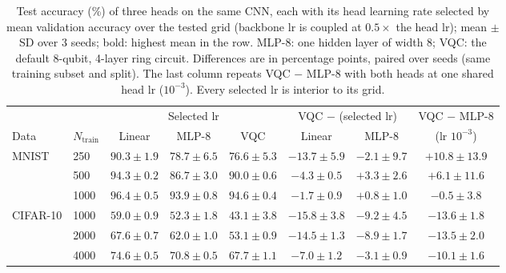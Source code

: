 \begin{table}[t]
\centering
\caption{Test accuracy (\%) of three heads on the same CNN, each with its head learning rate
selected by mean validation accuracy over the tested grid (backbone lr is coupled at $0.5\times$
the head lr); mean $\pm$ SD over 3 seeds; bold: highest mean in the row. MLP-8: one hidden
layer of width 8; VQC: the default 8-qubit, 4-layer ring circuit. Differences are in
percentage points, paired over seeds (same training subset and split). The last column
repeats VQC $-$ MLP-8 with both heads at one shared head lr ($10^{-3}$). Every selected lr is
interior to its grid.}
\label{tab:matched}
\small
\setlength{\tabcolsep}{4pt}
\begin{tabular}{llcccccc}
\toprule
& & \multicolumn{3}{c}{Selected lr} & \multicolumn{2}{c}{VQC $-$ (selected lr)} & VQC $-$ MLP-8 \\
\cmidrule(lr){3-5}\cmidrule(lr){6-7}\cmidrule(lr){8-8}
Data & $N_\mathrm{train}$ & Linear & MLP-8 & VQC & Linear & MLP-8 & (lr $10^{-3}$) \\
\midrule
\multirow{3}{*}{MNIST} & 250 & $\mathbf{90.3 \pm 1.9}$ & $78.7 \pm 6.5$ & $76.6 \pm 5.3$ & $-13.7 \pm 5.9$ & $-2.1 \pm 9.7$ & $+10.8 \pm 13.9$ \\
 & 500 & $\mathbf{94.3 \pm 0.2}$ & $86.7 \pm 3.0$ & $90.0 \pm 0.6$ & $-4.3 \pm 0.5$ & $+3.3 \pm 2.6$ & $+6.1 \pm 11.6$ \\
 & 1000 & $\mathbf{96.4 \pm 0.5}$ & $93.9 \pm 0.8$ & $94.6 \pm 0.4$ & $-1.7 \pm 0.9$ & $+0.8 \pm 1.0$ & $-0.5 \pm 3.8$ \\
\midrule
\multirow{3}{*}{CIFAR-10} & 1000 & $\mathbf{59.0 \pm 0.9}$ & $52.3 \pm 1.8$ & $43.1 \pm 3.8$ & $-15.8 \pm 3.8$ & $-9.2 \pm 4.5$ & $-13.6 \pm 1.8$ \\
 & 2000 & $\mathbf{67.6 \pm 0.7}$ & $62.0 \pm 1.0$ & $53.1 \pm 0.9$ & $-14.5 \pm 1.3$ & $-8.9 \pm 1.7$ & $-13.5 \pm 2.0$ \\
 & 4000 & $\mathbf{74.6 \pm 0.5}$ & $70.8 \pm 0.5$ & $67.7 \pm 1.1$ & $-7.0 \pm 1.2$ & $-3.1 \pm 0.9$ & $-10.1 \pm 1.6$ \\
\bottomrule
\end{tabular}
\end{table}
